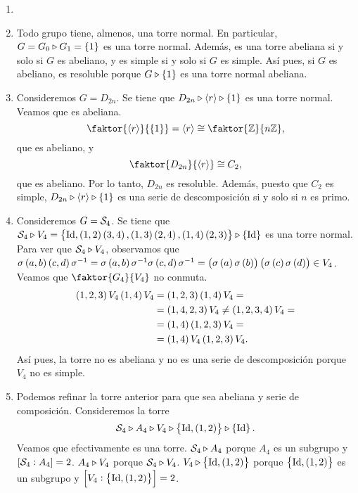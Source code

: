 \begin{example}
    \begin{enumerate}[1.]
        \item[]
        \item Todo grupo tiene, almenos, una torre normal. En particular, $G=G_0\triangleright G_1=\left\{ 1\right\}$ es una torre normal. Además, es una torre abeliana si y solo si $G$ es abeliano, y es simple si y solo si $G$ es simple. Así pues, si $G$ es abeliano, es resoluble porque $G\triangleright \left\{ 1\right\}$ es una torre normal abeliana.
        \item Consideremos $G=D_{2n}$. Se tiene que $D_{2n}\triangleright \left<r\right> \triangleright\left\{ 1\right\}$ es una torre normal. Veamos que es abeliana.
            \[
                \faktor{\left< r\right>}{\lc 1\rc}=\left< r\right>\cong \faktor{\z}{n\z},
            \]
            que es abeliano, y
            \[
                \faktor{D_{2n}}{\left< r\right>}\cong C_2,
            \]
            que es abeliano. Por lo tanto, $D_{2n}$ es resoluble. Además, puesto que $C_2$ es simple, $D_{2n}\triangleright \left<r\right> \triangleright\left\{ 1\right\}$ es una serie de descomposición si y solo si $n$ es primo.
        \item Consideremos $G=\mathcal{S}_4$. Se tiene que $\mathcal{S}_4\triangleright V_4=\left\{ \operatorname{Id}, \left( 1, 2\right)\left( 3,4\right),\left( 1,3\right)\left( 2,4\right),\left( 1,4\right)\left( 2,3\right)\right\}\triangleright\left\{ \operatorname{Id}\right\}$ es una torre normal. Para ver que $\mathcal{S}_4\triangleright V_4$, observamos que $\sigma\left( a, b\right)\left( c, d\right)\sigma^{-1}=\sigma\left( a, b\right)\sigma^{-1}\sigma\left( c, d\right)\sigma^{-1}=\left(\sigma\left( a\right)\sigma\left( b\right)\right)\left(\sigma\left( c\right)\sigma\left( d\right)\right)\in V_4$. Veamos que $\faktor{G_4}{V_4}$ no conmuta.
        \begin{align*}
            \left( 1,2,3\right) V_4\left( 1,4\right) V_4 &= \left( 1,2,3\right)\left( 1,4\right) V_4 = \\
            &= \left( 1,4,2,3\right) V_4 \neq \left( 1,2,3,4\right) V_4 =\\
            &= \left( 1,4\right)\left( 1,2,3\right) V_4 = \\
            &= \left( 1,4\right) V_4\left( 1,2,3\right) V_4.
        \end{align*}
        Así pues, la torre no es abeliana y no es una serie de descomposición porque $V_4$ no es simple.
        \item Podemos refinar la torre anterior para que sea abeliana y serie de composición. Consideremos la torre
            \[
                \mathcal{S}_4\triangleright A_4 \triangleright V_4 \triangleright \left\{ \operatorname{Id}, \left( 1,2\right) \right\}\triangleright\left\{ \operatorname{Id}\right\}.
            \]
            Veamos que efectivamente es una torre. $\mathcal{S}_4\triangleright A_4$ porque $A_4$ es un subgrupo y $\left[ \mathcal{S}_4 : A_4\right]=2$. $A_4\triangleright V_4$ porque $\mathcal{S}_4\triangleright V_4$. $V_4\triangleright \left\{ \operatorname{Id}, \left( 1,2\right) \right\}$ porque $\left\{ \operatorname{Id}, \left( 1,2\right) \right\}$ es un subgrupo y $\left[ V_4 : \left\{ \operatorname{Id}, \left( 1,2\right) \right\}\right]=2$.
            

\end{enumerate}
\end{example}

